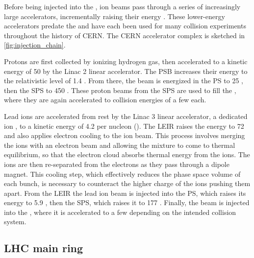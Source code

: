 Before being injected into the \lhc, ion beams pass through a series of increasingly large accelerators, incrementally raising their energy \cite{Benedikt:2004wm}.
These lower-energy accelerators predate the \lhc and have each been used for many collision experiments throughout the history of CERN.
The CERN accelerator complex is sketched in \cref{fig:injection_chain}.

Protons are first collected by ionizing hydrogen gas, then accelerated to a kinetic energy of 50 \MeV by the Linac 2 linear accelerator.
The \ac{PSB} increases their energy to the relativistic level of 1.4 \GeV.
From there, the beam is energized in the \ac{PS} to 25 \GeV, then the \ac{SPS} to 450 \GeV.
These proton beams from the \ac{SPS} are used to fill the \lhc, where they are again accelerated to collision energies of a few \TeV each.

Lead ions are accelerated from rest by the Linac 3 linear accelerator, a dedicated ion \linac, to a kinetic energy of 4.2 \MeV per nucleon (\MeVn).
The \ac{LEIR} raises the energy to 72 \MeVn and also applies electron cooling to the ion beam.
This process involves merging the ions with an electron beam and allowing the mixture to come to thermal equilibrium, so that the electron cloud absorbs thermal energy from the ions.
The ions are then re-separated from the electrons as they pass through a dipole magnet.
This cooling step, which effectively reduces the phase space volume of each bunch, is necessary to counteract the higher charge of the ions pushing them apart. %
From the \ac{LEIR} the lead ion beam is injected into the PS, which raises its energy to 5.9 \GeVn, then the \ac{SPS}, which raises it to 177 \GeVn.
Finally, the beam is injected into the \lhc, where it is accelerated to a few \TeVn depending on the intended collision system.


\subsection{LHC main ring}

